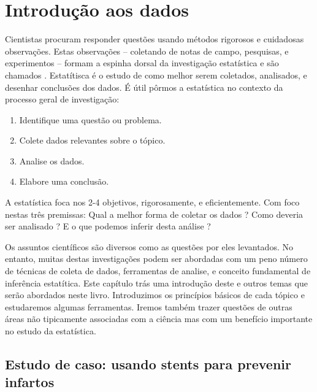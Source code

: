 \chapter{Introdução aos dados}
\label{introductionToData}


Cientistas procuram responder questões usando métodos rigorosos e cuidadosas observações. Estas observações -- coletando de notas de campo, pesquisas, e experimentos -- formam a espinha dorsal da investigação estatística e são chamados . Estatítisca é o estudo de como melhor serem coletados, analisados, e desenhar conclusões dos dados. É útil pôrmos a estatística no contexto da processo geral de investigação:
\begin{enumerate}
\setlength{\itemsep}{0mm}
\item Identifique uma questão ou problema.
\item Colete dados relevantes sobre o tópico.
\item Analise os dados.
\item Elabore uma conclusão.
\end{enumerate}
A estatística foca nos 2-4 objetivos, rigorosamente, e eficientemente. Com foco nestas três premissas: Qual a melhor forma de coletar os dados ? Como deveria ser analisado ? E o que podemos inferir desta análise ?

Os assuntos científicos são diversos como as questões por eles levantados. No entanto, muitas destas investigações podem ser abordadas com um peno número de técnicas de coleta de dados, ferramentas de analise, e conceito fundamental de inferência estatítica. Este capítulo trás uma introdução deste e outros temas que serão abordados neste livro. Introduzimos os princípios básicos de cada tópico e estudaremos algumas ferramentas. Iremos também trazer questões de outras áreas não tipicamente associadas com a ciência mas com um benefício importante no estudo da estatística.

\section[Estudo de caso: usando stents para prevenir infartos]{Estudo de caso: usando stents para prevenir infartos }
\label{basicExampleOfStentsAndStrokes}

